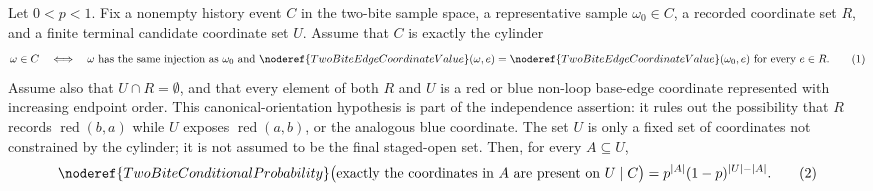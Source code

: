 \begin{helper}
Let \(0<p<1\).  Fix a nonempty history event \(C\) in the two-bite sample
space, a representative sample \(\omega_0\in C\), a recorded coordinate set
\(R\), and a finite terminal candidate coordinate set \(U\).  Assume that
\(C\) is exactly the cylinder
\[
\omega\in C
\quad\Longleftrightarrow\quad
\omega\hbox{ has the same injection as }\omega_0
\hbox{ and }
\noderef{TwoBiteEdgeCoordinateValue}(\omega,e)
=\noderef{TwoBiteEdgeCoordinateValue}(\omega_0,e)
\hbox{ for every }e\in R.
\tag{1}
\]
Assume also that \(U\cap R=\emptyset\), and that every element of both \(R\)
and \(U\) is a red or blue non-loop base-edge coordinate represented with
increasing endpoint order.  This canonical-orientation hypothesis is part of
the independence assertion: it rules out the possibility that \(R\) records
\(\operatorname{red}(b,a)\) while \(U\) exposes
\(\operatorname{red}(a,b)\), or the analogous blue coordinate.  The set \(U\)
is only a fixed set of coordinates not constrained by the cylinder; it is not
assumed to be the final staged-open set.  Then, for every \(A\subseteq U\),
\[
\noderef{TwoBiteConditionalProbability}
\bigl(\text{exactly the coordinates in }A\text{ are present on }U
\mid C\bigr)
=p^{|A|}(1-p)^{|U|-|A|}.
\tag{2}
\]
\end{helper}
